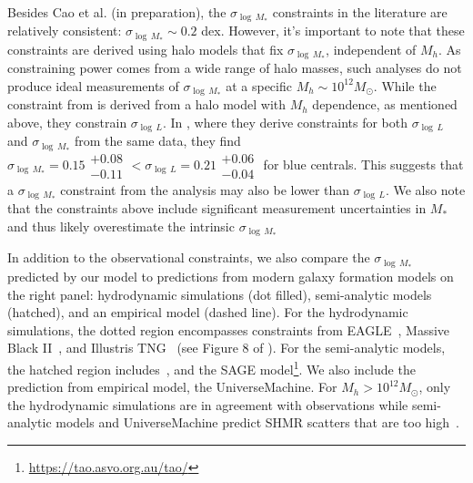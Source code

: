 \documentclass[12pt, letterpaper, preprint, tighten]{aastex62}
\begin{document}
Besides Cao et al. (in preparation), the $\sigma_{\log\,M_*}$ constraints 
in the literature are relatively consistent: $\sigma_{\log\,M_*} \sim 0.2$ dex.
However, it's important to note that these constraints are derived using halo
models that fix $\sigma_{\log\,M_*}$, independent of $M_h$. As constraining 
power comes from a wide range of halo masses, such analyses do not produce ideal 
measurements of $\sigma_{\log\,M_*}$ at a specific $M_h\sim 10^{12}M_\odot$. 
While the constraint from \cite{lange2018a} is derived from a halo model 
with $M_h$ dependence, as mentioned above, they constrain $\sigma_{\log\,L}$. 
In \cite{more2011}, where they derive constraints for both $\sigma_{\log\,L}$ 
and $\sigma_{\log\,M_*}$ from the same data, they find 
$\sigma_{\log\,M_*} = 0.15\substack{+0.08\\ -0.11} < \sigma_{\log\,L} = 0.21\substack{+0.06\\ -0.04}$
for blue centrals. This suggests that a $\sigma_{\log\,M_*}$ constraint from 
the \cite{lange2018a} analysis may also be lower than $\sigma_{\log\,L}$. We 
also note that the constraints above include significant measurement uncertainties 
in $M_*$ and thus likely overestimate the intrinsic $\sigma_{\log\,M_*}$ 

In addition to the observational constraints, we also compare the $\sigma_{\log\,M_*}$ 
predicted by our model to predictions from modern galaxy formation models 
on the right panel: hydrodynamic simulations (dot filled), semi-analytic models 
(hatched), and an empirical model (dashed line). For the hydrodynamic simulations, 
the dotted region encompasses constraints from EAGLE~\citep{mcalpine2016}, Massive 
Black II~\citep{khandai2015}, and Illustris TNG~\citep{pillepich2018} 
(see Figure 8 of \citealt{wechsler2018}). For the semi-analytic models, the 
hatched region includes~\cite{lu2014, somerville2012}, 
and the SAGE model\footnote{\url{https://tao.asvo.org.au/tao/}}. We also 
include the prediction from \cite{behroozi2018} empirical model, the {\sc UniverseMachine}.
For $M_h > 10^{12}M_\odot$, only the hydrodynamic simulations are in 
agreement with observations while semi-analytic models and {\sc UniverseMachine}
predict SHMR scatters that are too high~\citep{wechsler2018}.
\end{document}
